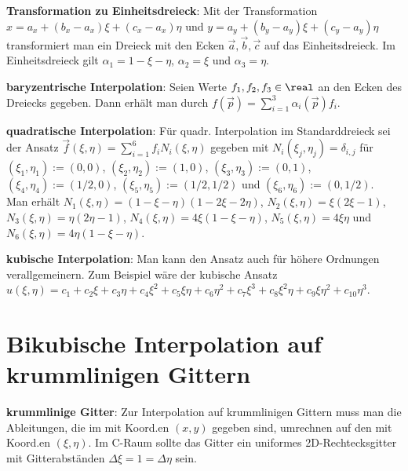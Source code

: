 \textbf{Transformation zu Einheitsdreieck}:
Mit der Transformation $x = a_x + (b_x - a_x) \xi + (c_x - a_x)\eta$ und
$y = a_y + (b_y - a_y) \xi + (c_y - a_y)\eta$ transformiert man ein Dreieck mit den
Ecken $\vec{a}, \vec{b}, \vec{c}$ auf das Einheitsdreieck.
Im Einheitsdreieck gilt $\alpha_1 = 1 - \xi - \eta$, $\alpha_2 = \xi$ und $\alpha_3 = \eta$.

\textbf{baryzentrische Interpolation}:
Seien Werte $f_1, f_2, f_3 \in \real$ an den Ecken des Dreiecks gegeben.
Dann erhält man  durch
$f(\vec{p}) = \sum_{i=1}^3 \alpha_i(\vec{p}) f_i$.

\linie

\textbf{quadratische Interpolation}:
Für quadr. Interpolation im Standarddreieck
sei der Ansatz
$\vec{f}(\xi, \eta) = \sum_{i=1}^6 f_i N_i(\xi, \eta)$ gegeben
mit $N_i(\xi_j, \eta_j) = \delta_{i,j}$ für
$(\xi_1, \eta_1) := (0, 0)$,
$(\xi_2, \eta_2) := (1, 0)$,
$(\xi_3, \eta_3) := (0, 1)$,
$(\xi_4, \eta_4) := (1/2, 0)$,
$(\xi_5, \eta_5) := (1/2, 1/2)$ und
$(\xi_6, \eta_6) := (0, 1/2)$.\\
Man erhält
$N_1(\xi, \eta) = (1 - \xi - \eta) (1 - 2\xi - 2\eta)$,
$N_2(\xi, \eta) = \xi (2\xi - 1)$,
$N_3(\xi, \eta) = \eta (2\eta - 1)$,
$N_4(\xi, \eta) = 4\xi (1 - \xi - \eta)$,
$N_5(\xi, \eta) = 4\xi\eta$ und
$N_6(\xi, \eta) = 4\eta (1 - \xi - \eta)$.

\textbf{kubische Interpolation}:
Man kann den Ansatz auch für höhere Ordnungen verallgemeinern.
Zum Beispiel wäre der kubische Ansatz\\
$u(\xi, \eta) = c_1 + c_2\xi + c_3\eta + c_4\xi^2 + c_5\xi\eta + c_6\eta^2 + c_7\xi^3 +
c_8\xi^2\eta + c_9\xi\eta^2 + c_{10}\eta^3$.

\section{%
    Bikubische Interpolation auf krummlinigen Gittern%
}

\textbf{krummlinige Gitter}:
Zur Interpolation auf krummlinigen Gittern muss man die Ableitungen, die im
 mit Koord.en $(x, y)$ gegeben sind,
umrechnen auf den  mit Koord.en $(\xi, \eta)$.
Im C-Raum sollte das Gitter ein uniformes 2D-Rechtecksgitter mit Gitterabständen
$\Delta\xi = 1 = \Delta\eta$ sein.

